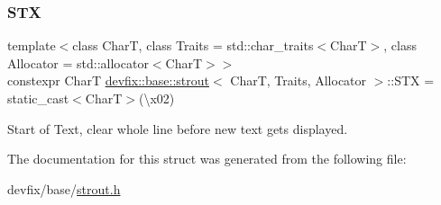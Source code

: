 \mbox{\label{structdevfix_1_1base_1_1strout_a76183010a1d8e9360e34b9cd9ab33f7d}} 
\subsubsection{\texorpdfstring{S\+TX}{STX}}
{\footnotesize\ttfamily template$<$class CharT, class Traits = std\+::char\+\_\+traits$<$\+Char\+T$>$, class Allocator = std\+::allocator$<$\+Char\+T$>$$>$ \\
constexpr CharT \hyperlink{structdevfix_1_1base_1_1strout}{devfix\+::base\+::strout}$<$ CharT, Traits, Allocator $>$\+::S\+TX = static\+\_\+cast$<$CharT$>$(\textquotesingle{}\textbackslash{}x02\textquotesingle{})\hspace{0.3cm}{\ttfamily [static]}}



Start of Text, clear whole line before new text gets displayed. 



The documentation for this struct was generated from the following file\+:\begin{DoxyCompactItemize}
\item 
devfix/base/\hyperlink{strout_8h}{strout.\+h}\end{DoxyCompactItemize}
